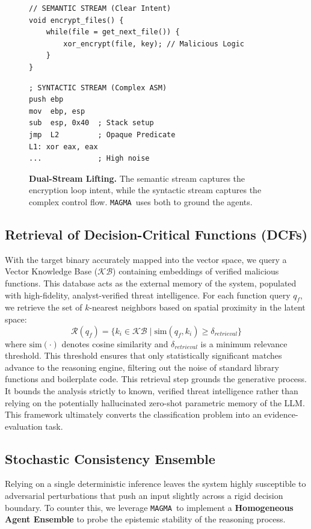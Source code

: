 \documentclass[pdflatex,sn-mathphys-num]{sn-jnl}
\newcommand{\sysname}{\texttt{MAGMA}~}
\begin{document}
\begin{figure}[h]
\centering

\begin{lstlisting}[style=cstyle]
// SEMANTIC STREAM (Clear Intent)
void encrypt_files() {
    while(file = get_next_file()) {
        xor_encrypt(file, key); // Malicious Logic
    }
}
\end{lstlisting}

\begin{lstlisting}[style=nasmstyle]
; SYNTACTIC STREAM (Complex ASM)
push ebp
mov  ebp, esp
sub  esp, 0x40  ; Stack setup
jmp  L2         ; Opaque Predicate
L1: xor eax, eax
...             ; High noise
\end{lstlisting}

\caption{\textbf{Dual-Stream Lifting.} The semantic stream captures the encryption loop intent, while the syntactic stream captures the complex control flow. \sysname uses both to ground the agents.}
\label{fig:code_example}
\end{figure}

\subsection{Retrieval of Decision-Critical Functions (DCFs)}
With the target binary accurately mapped into the vector space, we query a Vector Knowledge Base ($\mathcal{KB}$) containing embeddings of verified malicious functions. This database acts as the external memory of the system, populated with high-fidelity, analyst-verified threat intelligence. For each function query $q_f$, we retrieve the set of $k$-nearest neighbors based on spatial proximity in the latent space:
\begin{equation}
    \mathcal{R}(q_f) = \{ k_i \in \mathcal{KB} \mid \text{sim}(q_f, k_i) \geq \delta_{retrieval} \}
\end{equation}
where $\text{sim}(\cdot)$ denotes cosine similarity and $\delta_{retrieval}$ is a minimum relevance threshold. This threshold ensures that only statistically significant matches advance to the reasoning engine, filtering out the noise of standard library functions and boilerplate code. This retrieval step grounds the generative process. It bounds the analysis strictly to known, verified threat intelligence rather than relying on the potentially hallucinated zero-shot parametric memory of the LLM. This framework ultimately converts the classification problem into an evidence-evaluation task.

\subsection{Stochastic Consistency Ensemble}
\label{sec:ensemble}
Relying on a single deterministic inference leaves the system highly susceptible to adversarial perturbations that push an input slightly across a rigid decision boundary. To counter this, we leverage \sysname to implement a \textbf{Homogeneous Agent Ensemble} to probe the epistemic stability of the reasoning process. 
\end{document}

